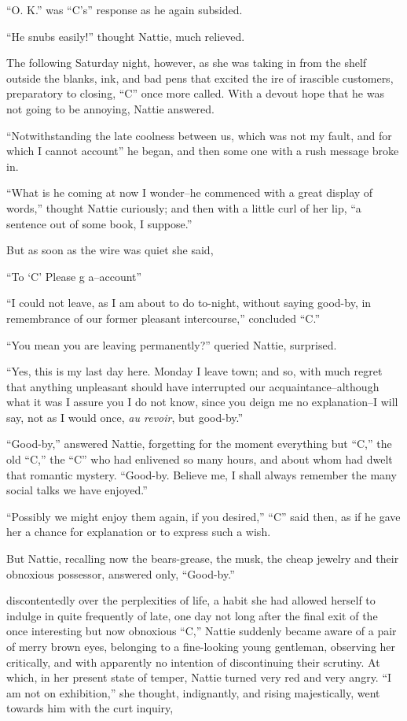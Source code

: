 ``O. K.'' was ``C's'' response as he again subsided.

``He snubs easily!'' thought Nattie, much relieved.

The following Saturday night, however, as she was taking in from the
shelf outside the blanks, ink, and bad pens that excited the ire of
irascible customers, preparatory to closing, ``C'' once more called. With
a devout hope that he was not going to be annoying, Nattie answered.

``Notwithstanding the late coolness between us, which was not my fault,
and for which I cannot account'' he began, and then some one with a rush
message broke in.

``What is he coming at now I wonder--he commenced with a great display of
words,'' thought Nattie curiously; and then with a little curl of her
lip, ``a sentence out of some book, I suppose.''

But as soon as the wire was quiet she said,

``To `C' Please g a--account''

``I could not leave, as I am about to do to-night, without saying
good-by, in remembrance of our former pleasant intercourse,'' concluded
``C.''

``You mean you are leaving permanently?'' queried Nattie, surprised.

``Yes, this is my last day here. Monday I leave town; and so, with much
regret that anything unpleasant should have interrupted our
acquaintance--although what it was I assure you I do not know, since you
deign me no explanation--I will say, not as I would once, \emph{au revoir}, but
good-by.''

``Good-by,'' answered Nattie, forgetting for the moment everything but
``C,'' the old ``C,'' the ``C'' who had enlivened so many hours, and about
whom had dwelt that romantic mystery. ``Good-by. Believe me, I shall
always remember the many social talks we have enjoyed.''

``Possibly we might enjoy them again, if you desired,'' ``C'' said then, as
if he gave her a chance for explanation or to express such a wish.

But Nattie, recalling now the bears-grease, the musk, the cheap jewelry
and their obnoxious possessor, answered only, ``Good-by.''








 discontentedly over the perplexities of life, a habit she had
allowed herself to indulge in quite frequently of late, one day not long
after the final exit of the once interesting but now obnoxious ``C,''
Nattie suddenly became aware of a pair of merry brown eyes, belonging to
a fine-looking young gentleman, observing her critically, and with
apparently no intention of discontinuing their scrutiny. At which, in
her present state of temper, Nattie turned very red and very angry. ``I
am not on exhibition,'' she thought, indignantly, and rising
majestically, went towards him with the curt inquiry,

